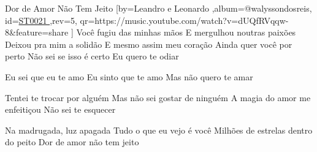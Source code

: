 \beginsong
{Dor de Amor Não Tem Jeito %
}[by={Leandro e Leonardo %
},album={@walyssondosreis},
id={\href{https://music.youtube.com/watch?v=dUQfRVqqw-8&feature=share %
}{ST0021 %
}},rev={5}, %
qr={https://music.youtube.com/watch?v=dUQfRVqqw-8&feature=share %
}]
\beginverse
Você fugiu das minhas mãos
E mergulhou noutras paixões
Deixou pra mim a solidão
E mesmo assim meu coração
Ainda quer você por perto
Não sei se isso é certo
Eu quero te odiar
\endverse

\beginverse
Eu sei que eu te amo
Eu sinto que te amo
Mas não quero te amar
\endverse

\beginverse
Tentei te trocar por alguém
Mas não sei gostar de ninguém
A magia do amor me enfeitiçou
Não sei te esquecer
\endverse

\beginchorus
Na madrugada, luz apagada
Tudo o que eu vejo é você
Milhões de estrelas dentro do peito
Dor de amor não tem jeito
\endchorus

